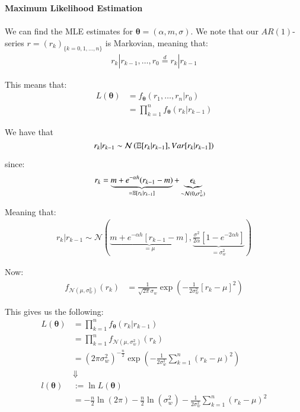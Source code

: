 \newpage 
\textbf{Maximum Likelihood Estimation}
\\~\\ 
We can find the MLE   estimates for $\bm{\theta} = (\alpha, m, \sigma)$. We note that our $AR(1)$-series $r = (r_{k})_{\{k = 0, 1, \dots, n\}}$ is Markovian, meaning that: 
\begin{align*}
r_{k}|r_{k-1}, \dots, r_{0} \stackrel{d}{=} r_{k}|r_{k-1}    
\end{align*}

This means that: 
\begin{align*}
L(\bm{\theta}) &= f_{\bm{\theta}}(r_{1}, \dots, r_{n}|r_{0}) \\ 
&= \prod_{k=1}^{n}f_{\bm{\theta}}(r_{k}|r_{k-1})
\end{align*}

We have that 
\[
r_{k}|r_{k-1} \sim \mathcal{N}\left(
\mathbb{E}[r_{k}|r_{k-1}], Var[r_{k}|r_{k-1}]
\right)
\]

since: 
\begin{align*}
r_{k} &= \underbrace{m + e^{-\alpha h}(r_{k-1}-m)}_{= \mathbb{E}[r_{k}|r_{k-1}]} 
+ \underbrace{\epsilon_{k}}_{\sim \mathcal{N}(0, \sigma_{w}^{2})}    
\end{align*}

Meaning that: 
\begin{align*}
r_{k}|r_{k-1} \sim \mathcal{N}\left(
\underbrace{
m + e^{-\alpha h}[r_{k-1}-m]
}_{= \mu}, 
\underbrace{
\frac{\sigma^{2}}{2\alpha}\left[1-e^{-2\alpha h}\right]
}_{= \sigma_{w}^{2}}
\right)    
\end{align*}

Now: 
\begin{align*}
f_{\mathcal{N}(\mu, \sigma_{w}^{2})}(r_{k}) &=
\frac{1}{\sqrt{2\pi}\sigma_{w}}\exp\left(
-\frac{1}{2\sigma_{w}^{2}}\left[r_{k} - \mu \right]^{2}
\right)
\end{align*}

This gives us the following: 
\begin{align*}
L(\bm{\theta}) &= \prod_{k=1}^{n}f_{\bm{\theta}}(r_{k}|r_{k-1}) \\ 
&= 
\prod_{k=1}^{n}f_{\mathcal{N}(\mu, \sigma_{w}^{2})}(r_{k}) 
\\ 
&= 
(2\pi\sigma_{w}^{2})^{-\frac{n}{2}}\exp\left(
-\frac{1}{2\sigma_{w}^{2}}\sum_{k=1}^{n}\left(
r_{k} - \mu
\right)^{2}
\right) \\ 
&\Downarrow \\ 
l(\bm{\theta}) &:= \ln L(\bm{\theta}) \\
&= 
-\frac{n}{2}\ln(2\pi) - \frac{n}{2}\ln(\sigma_{w}^{2})
-\frac{1}{2\sigma_{w}^{2}}\sum_{k=1}^{n}\left(r_{k} - \mu \right)^{2}
\end{align*}

